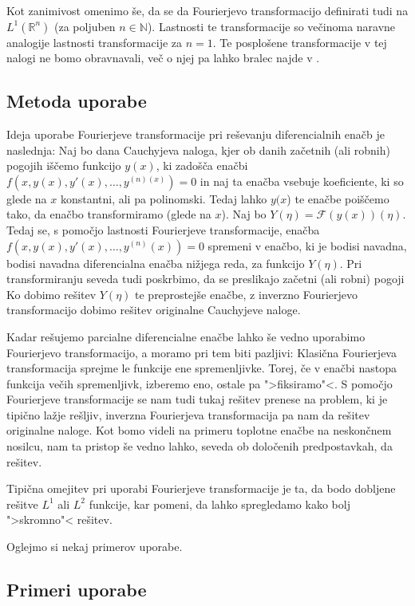 \documentclass[a4paper, 10pt]{article}
\newcommand{\mth}[1]{\ensuremath{\mathbb{#1}}}
\newcommand{\R}{\mth{R}}
\newcommand{\N}{\mth{N}}
\begin{document}
			Kot zanimivost omenimo še, da se da Fourierjevo transformacijo definirati tudi na $L^1(\R^n)$ (za poljuben $n\in\N$). Lastnosti te transformacije so večinoma naravne analogije lastnosti transformacije za $n = 1$. Te posplošene transformacije v tej nalogi ne bomo obravnavali, več o njej pa lahko bralec najde v \cite{bib:Mag}.
			
		\subsection{Metoda uporabe}
			Ideja uporabe Fourierjeve transformacije pri reševanju diferencialnih enačb je naslednja:
			Naj bo dana Cauchyjeva naloga, kjer ob danih začetnih (ali robnih) pogojih iščemo funkcijo $y(x)$, ki zadošča enačbi $f(x, y(x), y'(x), \ldots, y^{(n)(x)})=0$ in naj ta enačba vsebuje koeficiente, ki so glede na $x$ konstantni, ali pa polinomski. Tedaj lahko $y(x$) te enačbe poiščemo tako, da enačbo transformiramo (glede na $x$). Naj bo $Y(\eta)=\mathcal{F}(y(x))(\eta)$. Tedaj se, s pomočjo lastnosti Fourierjeve transformacije, enačba $f(x, y(x), y'(x), \ldots, y^{(n)}(x)) = 0$ spremeni v enačbo, ki je bodisi navadna, bodisi navadna diferencialna enačba nižjega reda, za funkcijo $Y(\eta)$. Pri transformiranju seveda tudi poskrbimo, da se preslikajo začetni (ali robni) pogoji Ko dobimo rešitev $Y(\eta)$ te preprostejše enačbe, z inverzno Fourierjevo transformacijo dobimo rešitev originalne Cauchyjeve naloge.
			
			Kadar rešujemo parcialne diferencialne enačbe lahko še vedno uporabimo Fourierjevo transformacijo, a moramo pri tem biti pazljivi: Klasična Fourierjeva transformacija sprejme le funkcije ene spremenljivke. Torej, če v enačbi nastopa funkcija večih spremenljivk, izberemo eno, ostale pa ">fiksiramo"<. S pomočjo Fourierjeve transformacije se nam tudi tukaj rešitev prenese na problem, ki je tipično lažje rešljiv, inverzna Fourierjeva transformacija pa nam da rešitev originalne naloge. Kot bomo videli na primeru toplotne enačbe na neskončnem nosilcu, nam ta pristop še vedno lahko, seveda ob določenih predpostavkah, da rešitev.
			
			Tipična omejitev pri uporabi Fourierjeve transformacije je ta, da bodo dobljene rešitve $L^1$ ali $L^2$ funkcije, kar pomeni, da lahko spregledamo kako bolj ">skromno"< rešitev.
			
			Oglejmo si nekaj primerov uporabe.
		\subsection{Primeri uporabe}
		
\end{document}
